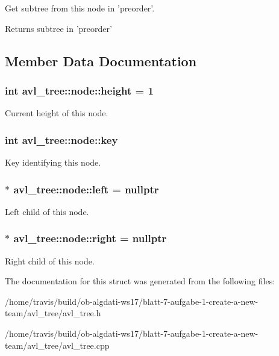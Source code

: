Get subtree from this node in 'preorder'. 

\begin{DoxyReturn}{Returns}
subtree in 'preorder' 
\end{DoxyReturn}


\subsection{Member Data Documentation}
\hypertarget{structavl__tree_1_1node_a57a93259cb3f71b15fe737a559d8f0cc}{
\subsubsection[{height}]{\setlength{\rightskip}{0pt plus 5cm}int avl\-\_\-tree\-::node\-::height = 1}}\label{structavl__tree_1_1node_a57a93259cb3f71b15fe737a559d8f0cc}
Current height of this node. \hypertarget{structavl__tree_1_1node_a07b67fe6e79e2272835dd6485272b823}{
\subsubsection[{key}]{\setlength{\rightskip}{0pt plus 5cm}int avl\-\_\-tree\-::node\-::key}}\label{structavl__tree_1_1node_a07b67fe6e79e2272835dd6485272b823}
Key identifying this node. \hypertarget{structavl__tree_1_1node_a3e7851f7104dd71af924b27e70d80f3a}{
\subsubsection[{left}]{$\ast$ avl\-\_\-tree\-::node\-::left = nullptr}}\label{structavl__tree_1_1node_a3e7851f7104dd71af924b27e70d80f3a}
Left child of this node. \hypertarget{structavl__tree_1_1node_aff21ea47ae19da99113bd7900fb69785}{
\subsubsection[{right}]{$\ast$ avl\-\_\-tree\-::node\-::right = nullptr}}\label{structavl__tree_1_1node_aff21ea47ae19da99113bd7900fb69785}
Right child of this node. 

The documentation for this struct was generated from the following files\-:\begin{DoxyCompactItemize}
\item 
/home/travis/build/ob-\/algdati-\/ws17/blatt-\/7-\/aufgabe-\/1-\/create-\/a-\/new-\/team/avl\-\_\-tree/avl\-\_\-tree.\-h\item 
/home/travis/build/ob-\/algdati-\/ws17/blatt-\/7-\/aufgabe-\/1-\/create-\/a-\/new-\/team/avl\-\_\-tree/avl\-\_\-tree.\-cpp\end{DoxyCompactItemize}
